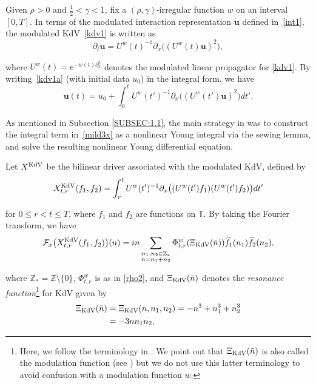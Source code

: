 \documentclass[letterpaper, 11pt,  reqno]{amsart}
\newcommand{\1}{\hspace{0.5mm}\text{I}\hspace{0.5mm}}
\newcommand{\noi}{\noindent}
\newcommand{\Z}{\mathbb{Z}}
\newcommand{\T}{\mathbb{T}}
\newcommand{\F}{\mathcal{F}}
\newcommand{\g}{\gamma}
\newcommand{\ft}{\widehat}
\newcommand{\dx}{\partial_x}
\newcommand{\dt}{\partial_t}
\newcommand{\uw}{U^w}
\newcommand{\uu}{\mathbf{u}}
\newcommand{\KDV}{\text{\rm KdV} }
\numberwithin{equation}{section}
\numberwithin{theorem}{section}
\begin{document}
Given  $\rho > 0 $ and  $\frac 12  < \g < 1$, 
fix a 
 $(\rho,\g)$-irregular function $w$ on an interval $[0, T]$.
In terms of 
the modulated interaction representation $\uu$
defined in~\eqref{int1}, 
the modulated KdV~\eqref{kdv1}
is written as 
\begin{equation}
\dt \uu = \uw(t)^{-1} \dx\big( (\uw(t) \uu)^2\big), 
\label{kdv1a}
\end{equation}

\noi
where 
$\uw (t)=e^{-   w(t)\dx^3}  $
denotes the modulated linear propagator for \eqref{kdv1}.
By writing~\eqref{kdv1a} (with initial data $u_0$) in the integral form, we have
\begin{equation}
\uu(t) = u_0 + \int_0 ^t \uw(t')^{-1}
\dx\big( (\uw(t') \uu)^2\big)dt'.
\label{mild3x}
\end{equation}

\noi
As mentioned in Subsection \ref{SUBSEC:1.1}, the main strategy
in \cite{CGLLO1}
was to construct the integral term 
in~\eqref{mild3x}
as a nonlinear Young integral via the sewing lemma, 
and solve the resulting nonlinear Young differential equation.



Let $X^\KDV$ be 
the 
bilinear driver  associated with the modulated KdV, 
defined by 
 \begin{align}
X^\KDV_{t,r}(f_1,f_2)
=\int_r^t  \uw(t')^{-1}  \partial_x
\big( (\uw(t')  f_1)( \uw(t') f_2 )\big) dt'
\label{K1}
\end{align}


\noi
for $0 \le r < t \le T$, 
where $f_1$ and $f_2$ are  functions  on $\T$.
By taking the Fourier transform, we have
\begin{align}
\F_x\big(X^\KDV_{t,r} (f_1,f_2)\big) (n)
= in \sum_{ \substack{n_1, n_2 \in \Z_*\\n = n_1+n_2}}
 \Phi^w_{t,r}(\Xi_\KDV (\bar n))
\ft f_1(n_1)  \ft f_2(n_2),
\label{K2}
\end{align}


\noi
where $\Z_* = \Z \setminus \{0\}$, $\Phi^w_{t,r}$ is as in \eqref{rho2}, 
and $\Xi_\KDV (\bar n)$ denotes the {\it resonance function}\footnote{Here, we follow
the terminology in \cite{Tao2}.  
We point out that $\Xi_\KDV (\bar n)$ is also called the modulation function (see \cite{KOY})
but we do not use this latter terminology to avoid
confusion with a modulation function $w$.
}
 for KdV given by 
\begin{align}
\begin{split}
\Xi_\KDV (\bar n) &  = \Xi_\KDV (n,n_1,n_2) 
= - n^3+ n_1^3 +n_2^3\\
&  = - 3n n_1 n_2, 
\end{split}
\label{K3a}
\end{align}
\end{document}
